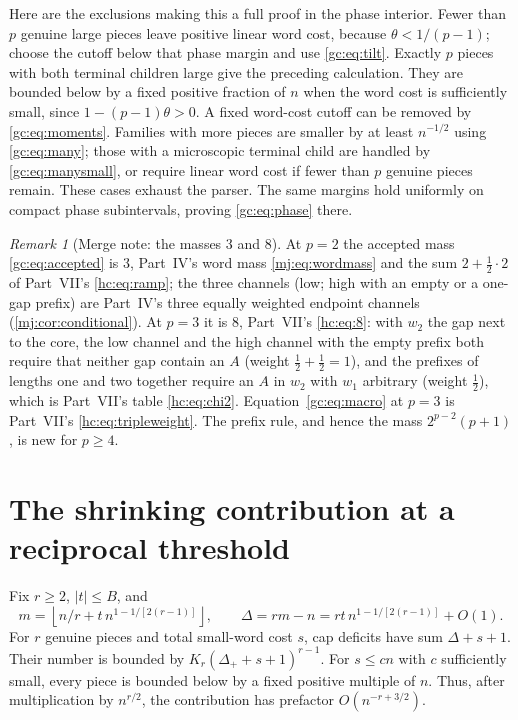 \documentclass[11pt,a4paper]{article}
\theoremstyle{definition}\newaliascnt{definition}{theorem}
\theoremstyle{remark}\newaliascnt{remark}{theorem}
\newtheorem{remark}[remark]{Remark}
\begin{document}
Here are the exclusions making this a full proof in the phase interior. Fewer
than $p$ genuine large pieces leave positive linear word cost, because
$\theta<1/(p-1)$; choose the cutoff below that phase margin and use
\eqref{gc:eq:tilt}. Exactly $p$ pieces with both terminal children large give
the preceding calculation. They are bounded below by a fixed positive fraction
of $n$ when the word cost is sufficiently small, since $1-(p-1)\theta>0$. A
fixed word-cost cutoff can be removed by \eqref{gc:eq:moments}. Families with
more pieces are smaller by at least $n^{-1/2}$ using \eqref{gc:eq:many}; those
with a microscopic terminal child are handled by \eqref{gc:eq:manysmall}, or
require linear word cost if fewer than $p$ genuine pieces remain. These cases
exhaust the parser. The same margins hold uniformly on compact phase
subintervals, proving \eqref{gc:eq:phase} there.

\begin{remark}[Merge note: the masses $3$ and $8$]
\label{gc:rem:masses}
At $p=2$ the accepted mass \eqref{gc:eq:accepted} is $3$, Part~IV's word mass
\eqref{mj:eq:wordmass} and the sum $2+\tfrac12\cdot2$ of Part~VII's
\eqref{hc:eq:ramp}; the three channels (low; high with an empty or a one-gap
prefix) are Part~IV's three equally weighted endpoint channels
(\cref{mj:cor:conditional}). At $p=3$ it is $8$, Part~VII's \eqref{hc:eq:8}:
with $w_2$ the gap next to the core, the low channel and the high channel with
the empty prefix both require that neither gap contain an $A$ (weight
$\tfrac12+\tfrac12=1$), and the prefixes of lengths one and two together
require an $A$ in $w_2$ with $w_1$ arbitrary (weight $\tfrac12$), which is
Part~VII's table \eqref{hc:eq:chi2}. Equation~\eqref{gc:eq:macro} at $p=3$ is
Part~VII's \eqref{hc:eq:tripleweight}. The prefix rule, and hence the mass
$2^{p-2}(p+1)$, is new for $p\ge4$.
\end{remark}

\section{The shrinking contribution at a reciprocal threshold}
\label{gc:sec:shrinking}
Fix $r\ge2$, $|t|\le B$, and
\[
 m=\left\lfloor n/r+t\,n^{1-1/[2(r-1)]}\right\rfloor,\qquad
 \Delta=rm-n=rt\,n^{1-1/[2(r-1)]}+O(1).
\]
For $r$ genuine pieces and total small-word cost $s$, cap deficits have sum
$\Delta+s+1$. Their number is bounded by $K_r(\Delta_++s+1)^{r-1}$. For
$s\le cn$ with $c$ sufficiently small, every piece is bounded below by a fixed
positive multiple of $n$. Thus, after multiplication by $n^{r/2}$, the
contribution has prefactor $O(n^{-r+3/2})$.
\end{document}
